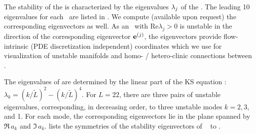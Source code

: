 The stability of the {\eqva} is characterized by the eigenvalues
$\eigExp[j]$ of the \stabmat.  The leading 10 eigenvalues for each
\eqv\ are listed in . We compute (available upon request)
the corresponding eigenvectors as well. As an \eqv\ with $\mathrm{Re}
\lambda_j > 0$ is unstable in the direction of the corresponding
eigenvector $\jEigvec{j}$, the eigenvectors provide flow-intrinsic
(PDE discretization independent) coordinates which we use for visualization
of unstable manifolds and homo- / hetero-clinic connections between
\eqva.


The eigenvalues of  are determined by the linear part of the KS
equation : $\lambda_k=(k/\tilde{L})^2-(k/\tilde{L})^4$.
For $L=22$, there are three pairs of unstable eigenvalues, corresponding,
in decreasing order, to three unstable modes $k=2,3$, and 1.  For each
mode, the corresponding eigenvectors lie in the plane spanned by
$\Re \, a_k$ and $\Im \, a_k$. 
lists the symmetries of the stability eigenvectors of
\eqva\  to .

